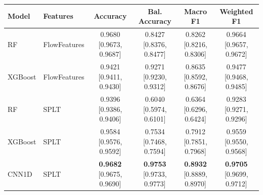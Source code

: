 \begin{tabular}{@{}llcccc@{}}
\toprule
\textbf{Model} & \textbf{Features} & \textbf{Accuracy} & \textbf{Bal. Accuracy} & \textbf{Macro F1} & \textbf{Weighted F1} \\
\midrule
RF & FlowFeatures & 0.9680 {\scriptsize [0.9673, 0.9687]} & 0.8427 {\scriptsize [0.8376, 0.8477]} & 0.8262 {\scriptsize [0.8216, 0.8306]} & 0.9664 {\scriptsize [0.9657, 0.9672]} \\
XGBoost & FlowFeatures & 0.9421 {\scriptsize [0.9411, 0.9430]} & 0.9271 {\scriptsize [0.9230, 0.9312]} & 0.8635 {\scriptsize [0.8592, 0.8676]} & 0.9477 {\scriptsize [0.9468, 0.9485]} \\
RF & SPLT & 0.9396 {\scriptsize [0.9386, 0.9406]} & 0.6040 {\scriptsize [0.5974, 0.6101]} & 0.6364 {\scriptsize [0.6296, 0.6424]} & 0.9283 {\scriptsize [0.9271, 0.9296]} \\
XGBoost & SPLT & 0.9584 {\scriptsize [0.9576, 0.9592]} & 0.7534 {\scriptsize [0.7468, 0.7594]} & 0.7912 {\scriptsize [0.7851, 0.7968]} & 0.9559 {\scriptsize [0.9550, 0.9568]} \\
CNN1D & SPLT & \textbf{0.9682} {\scriptsize [0.9675, 0.9690]} & \textbf{0.9753} {\scriptsize [0.9733, 0.9773]} & \textbf{0.8932} {\scriptsize [0.8889, 0.8970]} & \textbf{0.9705} {\scriptsize [0.9699, 0.9712]} \\
\bottomrule
\end{tabular}
